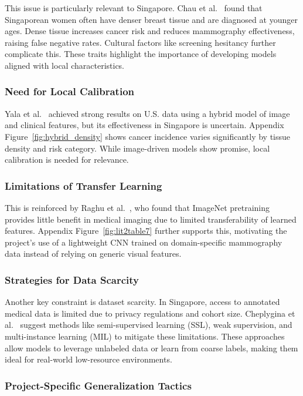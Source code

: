 \documentclass[12pt]{article}
\begin{document}
This issue is particularly relevant to Singapore. Chau et al.~\cite{6} found that Singaporean women often have denser breast tissue and are diagnosed at younger ages. Dense tissue increases cancer risk and reduces mammography effectiveness, raising false negative rates. Cultural factors like screening hesitancy further complicate this. These traits highlight the importance of developing models aligned with local characteristics.

\subsubsection{Need for Local Calibration}

Yala et al.~\cite{1} achieved strong results on U.S. data using a hybrid model of image and clinical features, but its effectiveness in Singapore is uncertain. Appendix Figure~\ref{fig:hybrid_density} shows cancer incidence varies significantly by tissue density and risk category. While image-driven models show promise, local calibration is needed for relevance.

\subsubsection{Limitations of Transfer Learning}

This is reinforced by Raghu et al.~\cite{2}, who found that ImageNet pretraining provides little benefit in medical imaging due to limited transferability of learned features. Appendix Figure~\ref{fig:lit2table7} further supports this, motivating the project’s use of a lightweight CNN trained on domain-specific mammography data instead of relying on generic visual features.

\subsubsection{Strategies for Data Scarcity}

Another key constraint is dataset scarcity. In Singapore, access to annotated medical data is limited due to privacy regulations and cohort size. Cheplygina et al.~\cite{4} suggest methods like semi-supervised learning (SSL), weak supervision, and multi-instance learning (MIL) to mitigate these limitations. These approaches allow models to leverage unlabeled data or learn from coarse labels, making them ideal for real-world low-resource environments.

\subsubsection{Project-Specific Generalization Tactics}
\end{document}
